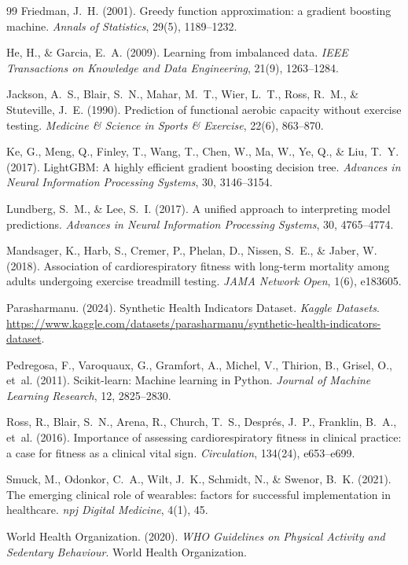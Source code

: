 \documentclass[11pt,a4paper]{article}
\begin{document}
\begin{thebibliography}{99}
Friedman, J.~H. (2001). Greedy function approximation: a gradient boosting machine. \emph{Annals of Statistics}, 29(5), 1189--1232.

He, H., \& Garcia, E.~A. (2009). Learning from imbalanced data. \emph{IEEE Transactions on Knowledge and Data Engineering}, 21(9), 1263--1284.

Jackson, A.~S., Blair, S.~N., Mahar, M.~T., Wier, L.~T., Ross, R.~M., \& Stuteville, J.~E. (1990). Prediction of functional aerobic capacity without exercise testing. \emph{Medicine \& Science in Sports \& Exercise}, 22(6), 863--870.

Ke, G., Meng, Q., Finley, T., Wang, T., Chen, W., Ma, W., Ye, Q., \& Liu, T.~Y. (2017). LightGBM: A highly efficient gradient boosting decision tree. \emph{Advances in Neural Information Processing Systems}, 30, 3146--3154.

Lundberg, S.~M., \& Lee, S.~I. (2017). A unified approach to interpreting model predictions. \emph{Advances in Neural Information Processing Systems}, 30, 4765--4774.

Mandsager, K., Harb, S., Cremer, P., Phelan, D., Nissen, S.~E., \& Jaber, W. (2018). Association of cardiorespiratory fitness with long-term mortality among adults undergoing exercise treadmill testing. \emph{JAMA Network Open}, 1(6), e183605.

Parasharmanu. (2024). Synthetic Health Indicators Dataset. \emph{Kaggle Datasets}. \url{https://www.kaggle.com/datasets/parasharmanu/synthetic-health-indicators-dataset}.

Pedregosa, F., Varoquaux, G., Gramfort, A., Michel, V., Thirion, B., Grisel, O., et~al. (2011). Scikit-learn: Machine learning in Python. \emph{Journal of Machine Learning Research}, 12, 2825--2830.

Ross, R., Blair, S.~N., Arena, R., Church, T.~S., Despr{\'e}s, J.~P., Franklin, B.~A., et~al. (2016). Importance of assessing cardiorespiratory fitness in clinical practice: a case for fitness as a clinical vital sign. \emph{Circulation}, 134(24), e653--e699.

Smuck, M., Odonkor, C.~A., Wilt, J.~K., Schmidt, N., \& Swenor, B.~K. (2021). The emerging clinical role of wearables: factors for successful implementation in healthcare. \emph{npj Digital Medicine}, 4(1), 45.

World Health Organization. (2020). \emph{WHO Guidelines on Physical Activity and Sedentary Behaviour}. World Health Organization.
\end{thebibliography}
\end{document}
